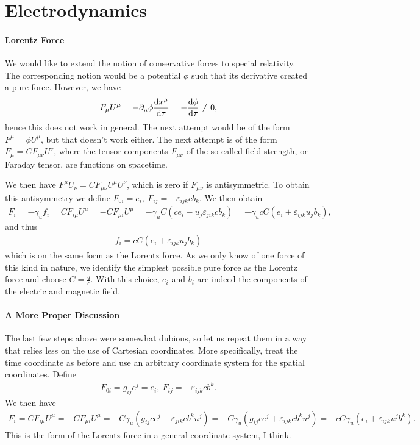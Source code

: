\section{Electrodynamics}

\paragraph{Lorentz Force}
We would like to extend the notion of conservative forces to special relativity. The corresponding notion would be a potential $\phi$ such that its derivative created a pure force. However, we have
\begin{align*}
	F_{\mu}U^{\mu} = -\partial^{}_{\mu}\phi\dv{x^{\mu}}{\tau} = -\dv{\phi}{\tau} \neq 0,
\end{align*}
hence this does not work in general. The next attempt would be of the form $F^{\mu} = \phi U^{\mu}$, but that doesn't work either. The next attempt is of the form $F_{\mu} = CF_{\mu\nu}U^{\nu}$, where the tensor components $F_{\mu\nu}$ of the so-called field strength, or Faraday tensor, are functions on spacetime.

We then have $F^{\mu}U_{\nu} = CF_{\mu\nu}U^{\mu}U^{\nu}$, which is zero if $F_{\mu\nu}$ is antisymmetric. To obtain this antisymmetry we define $F_{0i} = e_{i},\ F_{ij} = -\varepsilon_{ijk}cb_{k}$. We then obtain
\begin{align*}
	F_{i} = -\gamma_{u}f_{i} = CF_{i\mu}U^{\mu} = -CF_{\mu i}U^{\mu} = -\gamma_{u}C(ce_{i} - u_{j}\varepsilon_{jik}cb_{k}) = -\gamma_{u}cC(e_{i} + \varepsilon_{ijk}u_{j}b_{k}),
\end{align*}
and thus
\begin{align*}
	f_{i} = cC(e_{i} + \varepsilon_{ijk}u_{j}b_{k})
\end{align*}
which is on the same form as the Lorentz force. As we only know of one force of this kind in nature, we identify the simplest possible pure force as the Lorentz force and choose $C = \frac{q}{c}$. With this choice, $e_{i}$ and $b_{i}$ are indeed the components of the electric and magnetic field.

\paragraph{A More Proper Discussion}
The last few steps above were somewhat dubious, so let us repeat them in a way that relies less on the use of Cartesian coordinates. More specifically, treat the time coordinate as before and use an arbitrary coordinate system for the spatial coordinates. Define
\begin{align*}
	F_{0i} = g_{ij}e^{j} = e_{i},\ F_{ij} = -\varepsilon_{ijk}cb^{k}.
\end{align*}
We then have
\begin{align*}
	F_{i} = CF_{i\mu}U^{\mu} = -CF_{\mu i}U^{\mu} = -C\gamma_{u}(g_{ij}ce^{j} - \varepsilon_{jik}cb^{k}u^{j}) = -C\gamma_{u}(g_{ij}ce^{j} + \varepsilon_{ijk}cb^{k}u^{j}) = -cC\gamma_{u}(e_{i} + \varepsilon_{ijk}u^{j}b^{k}).
\end{align*}
This is the form of the Lorentz force in a general coordinate system, I think.

